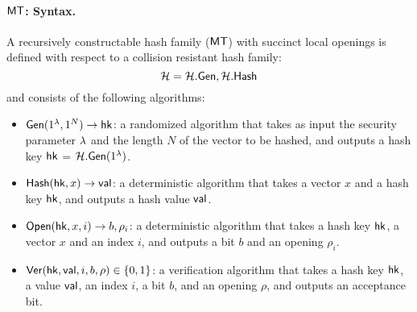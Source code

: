 \paragraph{$\mathsf{MT}$: Syntax.}
A recursively constructable hash family ($\mathsf{MT}$) with succinct local openings is defined with respect to a collision resistant hash family:
$$\mathcal{H} = \mathcal{H}.\mathsf{Gen}, \mathcal{H}.\mathsf{Hash}$$
and consists of the following algorithms:
\begin{itemize}
    \item $\mathsf{Gen}(1^\lambda, 1^N
    )\to \mathsf{hk}$: a randomized algorithm that takes as input the security parameter $\lambda$ and the length $N$ of the vector to be hashed,
    and outputs a hash key $\mathsf{hk}$ = $\mathcal{H}.\mathsf{Gen}(1^\lambda)$. 
    \item $\mathsf{Hash}(\mathsf{hk}, x)\to \mathsf{val}$: a deterministic algorithm that takes a vector $x$ and a hash key $\mathsf{hk}$, and outputs a hash value $\mathsf{val}$.
    \item $\mathsf{Open}(\mathsf{hk}, x, i)\to b, \rho_i$: a deterministic algorithm that takes a hash key $\mathsf{hk}$, a vector $x$ and an index $i$, and outputs a bit $b$ and an opening $\rho_i$.
    \item $\mathsf{Ver}(\mathsf{hk}, \mathsf{val}, i, b, \rho ) \in \left \{{0,1} \right \}$: a verification algorithm that takes a hash key $\mathsf{hk}$, a value $\mathsf{val}$, an index $i$, a bit $b$, and an opening $\rho$, and outputs an acceptance bit.
\end{itemize}

